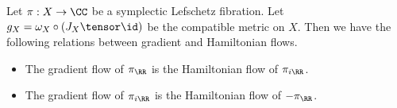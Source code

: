 

    Let $\pi: X\to \CC$ be a symplectic Lefschetz fibration. Let $g_X=\omega_X\circ (J_X\tensor \id)$ be the compatible metric on $X$.
    Then we have the following relations between gradient and Hamiltonian flows. 
    \begin{itemize}
        \item The gradient flow of $\pi_\RR$ is the Hamiltonian flow of $\pi_{i\RR}$. 
        \item The gradient flow of $\pi_{i\RR}$ is the Hamiltonian flow of $-\pi_\RR$. 
	\end{itemize}

